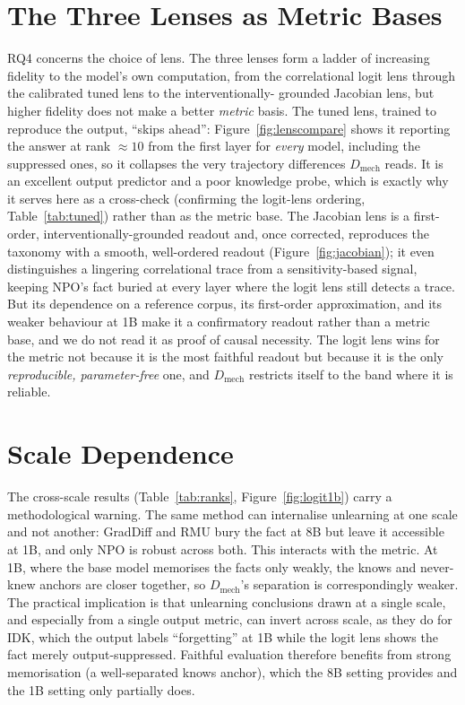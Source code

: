 \section{The Three Lenses as Metric Bases}
\label{sec:d-lenses}

RQ4 concerns the choice of lens. The three lenses form a ladder of increasing fidelity to the model's own
computation, from the correlational logit lens through the calibrated tuned lens to the interventionally-
grounded Jacobian lens, but higher fidelity does not make a better \emph{metric} basis. The tuned lens, trained to reproduce
the output, ``skips ahead'': Figure~\ref{fig:lenscompare} shows it reporting the answer at rank ${\approx}10$
from the first layer for \emph{every} model, including the suppressed ones, so it collapses the very
trajectory differences $D_\text{mech}$ reads. It is an excellent output predictor and a poor knowledge
probe, which is exactly why it serves here as a cross-check (confirming the logit-lens ordering,
Table~\ref{tab:tuned}) rather than as the metric base. The Jacobian lens is a first-order,
interventionally-grounded readout and, once corrected, reproduces the taxonomy with a smooth, well-ordered
readout (Figure~\ref{fig:jacobian}); it even distinguishes a lingering correlational trace from a
sensitivity-based signal, keeping NPO's fact buried at every layer where the logit lens still detects a
trace. But its dependence on a reference corpus, its first-order approximation, and its weaker behaviour at
1B make it a confirmatory readout rather than a metric base, and we do not read it as proof of causal
necessity. The
logit lens wins for the metric not because it is the most faithful readout but because it is the only
\emph{reproducible, parameter-free} one, and $D_\text{mech}$ restricts itself to the band where it is
reliable.

\section{Scale Dependence}
\label{sec:d-scale}

The cross-scale results (Table~\ref{tab:ranks}, Figure~\ref{fig:logit1b}) carry a methodological warning.
The same method can internalise unlearning at one scale and not another: GradDiff and RMU bury the fact at
8B but leave it accessible at 1B, and only NPO is robust across both. This interacts with the metric. At 1B,
where the base model memorises the facts only weakly, the knows and never-knew anchors are closer together,
so $D_\text{mech}$'s separation is correspondingly weaker. The practical implication is that unlearning
conclusions drawn at a single scale, and especially from a single output metric, can invert across scale, as
they do for IDK, which the output labels ``forgetting'' at 1B while the logit lens shows the fact merely
output-suppressed. Faithful evaluation therefore benefits from strong memorisation (a well-separated knows
anchor), which the 8B setting provides and the 1B setting only partially does.

